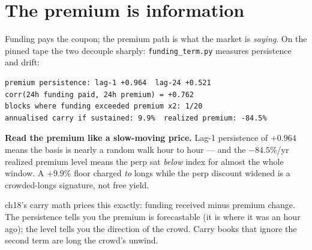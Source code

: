 \section{The premium is information}\label{sec:premsig}
Funding pays the coupon; the premium path is what the market is
\emph{saying}. On the pinned tape the two decouple sharply:
\texttt{funding\_term.py} measures persistence and drift:
\begin{verbatim}
premium persistence: lag-1 +0.964  lag-24 +0.521
corr(24h funding paid, 24h premium) = +0.762
blocks where funding exceeded premium x2: 1/20
annualised carry if sustained: 9.9%  realized premium: -84.5%
\end{verbatim}
\begin{example}\label{ex:prem18}
\textbf{Read the premium like a slow-moving price.} Lag-1
persistence of $+0.964$ means the basis is nearly a random walk
hour to hour --- and the $-84.5\%$/yr realized premium level
means the perp sat \emph{below} index for almost the whole
window. A $+9.9\%$ floor charged \emph{to} longs while the perp
discount widened is a crowded-longs signature, not free yield.
\begin{solution}
ch18's carry math prices this exactly: funding received minus
premium change. The persistence tells you the premium is
forecastable (it is where it was an hour ago); the level tells
you the direction of the crowd. Carry books that ignore the
second term are long the crowd's unwind.
\end{solution}
\end{example}
